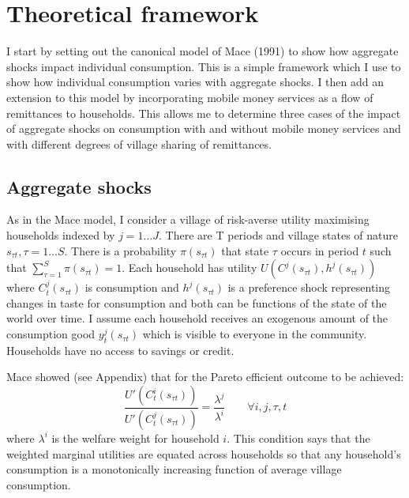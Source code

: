 \newpage
\section{Theoretical framework}
I start by setting out the canonical model of Mace (1991)  \nocite{mace1991full} to show how aggregate shocks impact individual consumption. This is a simple framework which I use to show how individual consumption varies with aggregate shocks. I then add an extension to this model by incorporating mobile money services as a flow of remittances to households. This allows me to determine three cases of the impact of aggregate shocks on consumption with and without mobile money services and with different degrees of village sharing of remittances.   

\subsection{Aggregate shocks}

As in the Mace model, I consider a village of risk-averse utility maximising households indexed by $j=1 \ldots J$. There are T periods and village states of nature $s_{\tau t}, \tau=1 \ldots S$. There is a probability $\pi(s_{\tau t})$ that state $\tau$ occurs in period $t$ such that $\sum_{\tau=1}^{S} \pi(s_{\tau t})=1$.  Each household has utility $U(C^j(s_{\tau t}),h^j(s_{\tau t}))$ where $C^j_t(s_{\tau t})$ is consumption and $h^j(s_{\tau t})$ is a preference shock representing changes in taste for consumption and both can be functions of the state of the world over time. I assume each household receives an exogenous amount of the consumption good $y_t^j(s_{\tau t})$ which is visible to everyone in the community. Households have no access to savings or credit. 

Mace showed (see Appendix) that for the Pareto efficient outcome to be achieved:
\begin{equation} \label{eq: FOC1}
\frac{U'(C^i_t(s_{\tau t}))}{U'(C^j_t(s_{\tau t}))}=\frac{\lambda^j}{\lambda^i} \qquad \forall i, j, \tau, t
\end{equation}
where $\lambda^i$ is the welfare weight for household $i$. This condition says that the weighted marginal utilities are equated across households so that any household's consumption is a monotonically increasing function of average village consumption. 

